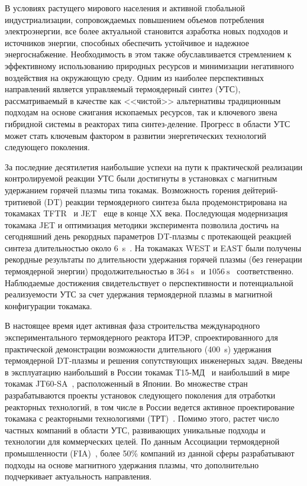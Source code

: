 
{\actuality} В условиях растущего мирового населения и активной глобальной индустриализации, сопровождаемых повышением объемов потребления электроэнергии,
все более актуальной становится азработка новых подходов и источников энергии, способных обеспечить устойчивое и надежное энергоснабжение. Необходимость в этом также обуславливается стремлением к эффективному использованию природных ресурсов и минимизации негативного воздействия на окружающую среду. Одним из наиболее перспективных направлений является управляемый термоядерный синтез (УТС), рассматриваемый в качестве как <<чистой>> альтернативы традиционным подходам на основе сжигания ископаемых ресурсов, так и ключевого звена гибридной системы в реакторах типа синтез-деление. Прогресс в области УТС может стать ключевым фактором в развитии энергетических технологий следующего поколения.

За последние десятилетия наибольшие успехи на пути к практической реализации контролируемой реакции УТС были достигнуты в установках с магнитным удержанием горячей плазмы типа токамак. Возможность горения дейтерий-тритиевой (DT) реакции термоядерного синтеза была продемонстрирована на токамаках TFTR~\cite{Skinner1997} и JET~\cite{Keilhacker1999} еще в конце XX века. Последующая модернизация токамака JET и оптимизация методики эксперимента позволила достичь на сегодняшний день рекордных параметров DT-плазмы с протекающей реакцией синтеза длительностью около \SI{6}{\second}~\cite{Maggi2024,Kappatou2025}. На токамаках WEST и EAST были получены рекордные результаты по длительности удержания горячей плазмы (без генерации термоядерной энергии) продолжительностью в \(\SI{364}{\second}\)~\cite{Shi2025} и \(\SI{1056}{\second}\)~\cite{Gong2024} соответственно. Наблюдаемые достижения свидетельствует о перспективности и потенциальной реализуемости УТС за счет удержания термоядерной плазмы в магнитной конфигурации токамака.

В настоящее время идет активная фаза строительства международного экспериментального термоядерного реактора ИТЭР, спроектированного для практической демонстрации возможности длительного (\SI{400}{\second}) удержания термоядерной DT-плазмы и решения сопутствующих инженерных задач. Введены в эксплуатацию наибольший в России токамак Т15-МД~\cite{Velikhov2024} и наибольший в мире токамак JT60-SA~\cite{Shirai2024}, расположенный в Японии. Во множестве стран разрабатываются проекты установок следующего поколения для отработки реакторных технологий, в том числе в России ведется активное проектирование токамака с реакторными технологиями (ТРТ)~\cite{Krasilnikov2021}. Помимо этого, растет число частных компаний в области УТС, развивающих уникальные подходы и технологии для коммерческих целей. По данным Ассоциации термоядерной промышленности (FIA)~\cite{FIA}, более 50\% компаний из данной сферы разрабатывают подходы на основе магнитного удержания плазмы, что дополнительно подчеркивает актуальность направления.

